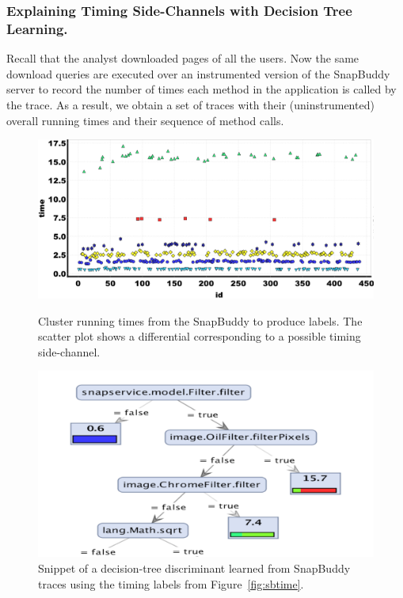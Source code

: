 \documentclass{article}
\begin{document}
\subsubsection*{Explaining Timing Side-Channels with Decision Tree Learning.}
Recall that the analyst downloaded pages
of all the users. Now the same download queries are executed over an
instrumented version of the SnapBuddy server to record the number of
times each method in the application is called by the trace. As a
result, we obtain a
set of traces with their (uninstrumented) overall running times and their
sequence of method calls.

\begin{figure}[t]
\centering
\begin{minipage}[b]{0.47\textwidth}
  \centering
  \includegraphics[width=\textwidth]{SnapBuddy_scatter_2}
  \caption{Cluster running times from the SnapBuddy to produce labels. The scatter plot shows a differential corresponding to a possible timing side-channel.}
  \label{fig:sbtime}
\end{minipage}\hfill
\begin{minipage}[b]{0.50\textwidth}
  \centering
  \includegraphics[width=\textwidth]{SnapBuddy_DecisionTree_1}
  \caption{Snippet of a decision-tree discriminant learned from SnapBuddy traces using the timing labels from Figure~\ref{fig:sbtime}.}
  \label{fig:sbdectree}
\end{minipage}
\vspace{-1em}
\end{figure}
\end{document}
